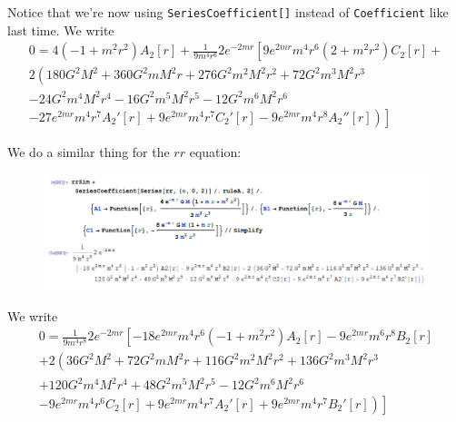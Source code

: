 \documentclass{book}
\theoremstyle{definition}
\newcommand{\nn}{\nonumber}
\newcommand{\f}[2]{\frac{#1}{#2}}
\newcommand{\lp}{\left(}
\newcommand{\rp}{\right)}
\newcommand{\lb}{\left[}
\newcommand{\rb}{\right]}
\begin{document}
Notice that we're now using \texttt{SeriesCoefficient[]} instead of \texttt{Coefficient} like last time. We write
\begin{align}
0 = 
4 (-1 + m^2 r^2) A_2[r] +  \f{1}{9m^4r^6}
 2 e^{-2 m r} \lb 9 e^{2 m r} m^4 r^6 (2 + m^2 r^2) C_2[r] + \right. \nn\\ 
\left.  2 \lp   180 G^2 M^2 + 360 G^2 m M^2 r + 276 G^2 m^2 M^2 r^2 + 
72 G^2 m^3 M^2 r^3\right. \right. \nn\\ 
\left. - 24 G^2 m^4 M^2 r^4 - 16 G^2 m^5 M^2 r^5 - 
12 G^2 m^6 M^2 r^6 \right.\nn\\
\left.  - 27 e^{2 m r} m^4 r^7 A_2'[r] + 
9 e^{2 m r} m^4 r^7 C_2'[r] - 
9 e^{2 m r} m^4 r^8 A_2''[r]    \rp \left.    \rb
\end{align}


We do a similar thing for the $rr$ equation:
\begin{figure}[!htb]
	\centering
	\includegraphics[scale=0.25]{rr2Sim}
\end{figure}
We write
\begin{align}
0 = \f{1}{9 m^4 r^8} 2 e^{-2 m r} \lb -18 e^{2 m r}
m^4 r^6 (-1 + m^2 r^2) A_2[r] - 9 e^{2 m r} m^6 r^8 B_2[r] \right.\nn\\ 
\left. + 
2 \lp 36 G^2 M^2 + 72 G^2 m M^2 r + 116 G^2 m^2 M^2 r^2 + 
136 G^2 m^3 M^2 r^3 \right. \right. \nn\\
\left. + 120 G^2 m^4 M^2 r^4 + 
48 G^2 m^5 M^2 r^5 - 12 G^2 m^6 M^2 r^6 \right.\nn\\
\left. -  9 e^{2 m r} m^4 r^6 C_2[r] + 
9 e^{2 m r} m^4 r^7 A_2'[r] + 
9 e^{2 m r} m^4 r^7 B_2'[r]\rp \left. \rb
\end{align}
\end{document}

